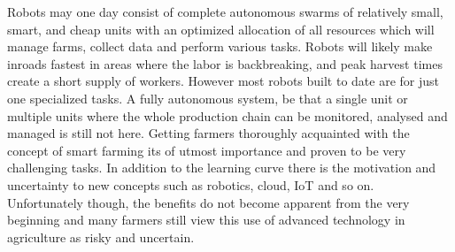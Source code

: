 \documentclass[review]{elsarticle}
\begin{document}
Robots may one day consist of complete autonomous swarms of relatively small, smart, and cheap units with an optimized allocation of all resources which will manage farms, collect data and perform various tasks. Robots will likely make inroads fastest in areas where the labor is backbreaking, and peak harvest times create a short supply of workers. However most robots built to date are for just one specialized tasks. A fully autonomous system, be that a single unit or multiple units where the whole production chain can be monitored, analysed and managed is still not here. Getting farmers thoroughly acquainted with the concept of smart farming its of utmost importance and proven to be very challenging tasks. In addition to the learning curve there is the motivation and uncertainty to new concepts such as robotics, cloud, IoT and so on. Unfortunately though, the benefits do not become apparent from the very beginning and many farmers still view this use of advanced technology in agriculture as risky and uncertain.





        
    


\end{document}
